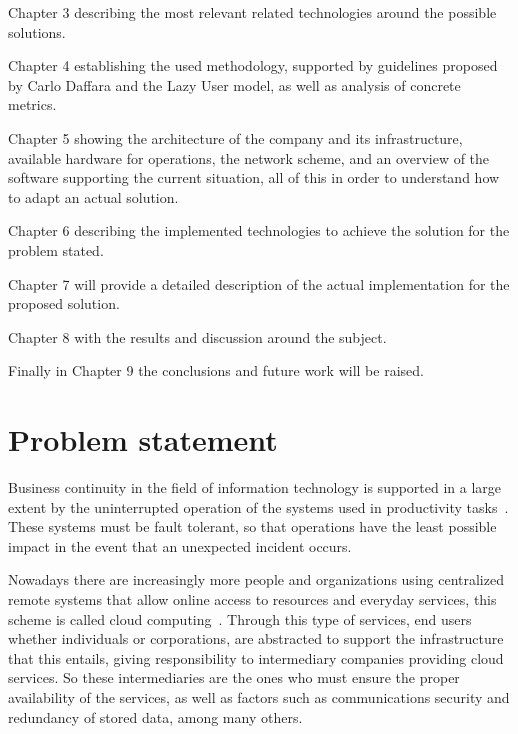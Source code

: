 \documentclass[a4paper, 12pt]{book}
\begin{document}
\noindent Chapter 3 describing the most relevant related technologies around the possible solutions.\bigskip

\noindent Chapter 4 establishing the used methodology, supported by guidelines proposed by Carlo Daffara and the Lazy User model, as well as analysis of concrete metrics.\bigskip

\noindent Chapter 5 showing the architecture of the company and its infrastructure, available hardware for operations, the network scheme, and an overview of the software supporting the current situation, all of this in order to understand how to adapt an actual solution.\bigskip

\noindent Chapter 6 describing the implemented technologies to achieve the solution for the problem stated.\bigskip

\noindent Chapter 7 will provide a detailed description of the actual implementation for the proposed solution.\bigskip

\noindent Chapter 8 with the results and discussion around the subject.\bigskip

\noindent Finally in Chapter 9 the conclusions and future work will be raised.\bigskip


%
\chapter{Problem statement}
\label{chap:problem}

Business continuity in the field of information technology is supported in a large extent by the uninterrupted operation of the systems used in productivity tasks~\cite{ISO22399}. These systems must be fault tolerant, so that operations have the least possible impact in the event that an unexpected incident occurs.\bigskip

\noindent Nowadays there are increasingly more people and organizations using centralized remote systems that allow online access to resources and everyday services, this scheme is called cloud computing~\cite{MandG}. Through this type of services, end users whether individuals or corporations, are abstracted to support the infrastructure that this entails, giving responsibility to intermediary companies providing cloud services. So these intermediaries are the ones who must ensure the proper availability of the services, as well as factors such as communications security and redundancy of stored data, among many others.\bigskip
\end{document}
